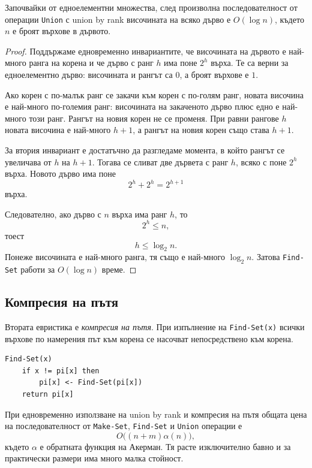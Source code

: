 \begin{lem}
Започвайки от едноелементни множества, след произволна последователност от операции \verb|Union| с union by rank височината на всяко дърво е $O(\log n)$, където $n$ е броят върхове в дървото.
\end{lem}

\begin{proof}
Поддържаме едновременно инвариантите, че височината на дървото е най-много ранга на корена и че дърво с ранг $h$ има поне $2^h$ върха. Те са верни за едноелементно дърво: височината и рангът са $0$, а броят върхове е $1$.

Ако корен с по-малък ранг се закачи към корен с по-голям ранг, новата височина е най-много по-големия ранг: височината на закаченото дърво плюс едно е най-много този ранг. Рангът на новия корен не се променя. При равни рангове $h$ новата височина е най-много $h+1$, а рангът на новия корен също става $h+1$.

За втория инвариант е достатъчно да разгледаме момента, в който рангът се увеличава от $h$ на $h+1$. Тогава се сливат две дървета с ранг $h$, всяко с поне $2^h$ върха. Новото дърво има поне
\[
2^h+2^h=2^{h+1}
\]
върха.

Следователно, ако дърво с $n$ върха има ранг $h$, то
\[
2^h\leq n,
\]
тоест
\[
h\leq \log_2 n.
\]
Понеже височината е най-много ранга, тя също е най-много $\log_2 n$. Затова \verb|Find-Set| работи за $O(\log n)$ време.
\end{proof}

\subsection{Компресия на пътя}\label{s:7.5.3}

\begin{defn}
Втората евристика е \emph{компресия на пътя}. При изпълнение на \verb|Find-Set(x)| всички върхове по намерения път към корена се насочват непосредствено към корена.
\end{defn}

\begin{verbatim}
Find-Set(x)
    if x != pi[x] then
        pi[x] <- Find-Set(pi[x])
    return pi[x]
\end{verbatim}

При едновременно използване на union by rank и компресия на пътя общата цена на последователност от \verb|Make-Set|, \verb|Find-Set| и \verb|Union| операции е
\[
O\bigl((n+m)\alpha(n)\bigr),
\]
където $\alpha$ е обратната функция на Акерман. Тя расте изключително бавно и за практически размери има много малка стойност.

